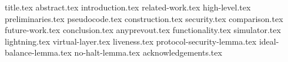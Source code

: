 \documentclass[sigconf]{acmart}
\begin{document}
\pagestyle{plain}


{title.tex}
{abstract.tex}
{introduction.tex}
{related-work.tex}
{high-level.tex}
{preliminaries.tex}
{pseudocode.tex}
{construction.tex}
{security.tex}
{comparison.tex}
{future-work.tex}
{conclusion.tex}
{anyprevout.tex}
{functionality.tex}
{simulator.tex}
{lightning.tex}
{virtual-layer.tex}
{liveness.tex}
{protocol-security-lemma.tex}
{ideal-balance-lemma.tex}
{no-halt-lemma.tex}
{acknowledgements.tex}


\end{document}
